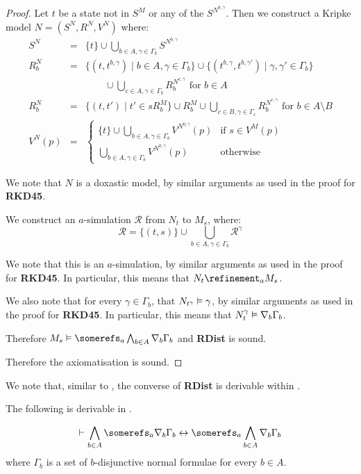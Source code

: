 \begin{proof}
Let $t$ be a state not in $S^M$ or any of the $S^{N^{b,\gamma}}$. Then we
construct a Kripke model $N = (S^N, R^N, V^N)$ where:
\begin{eqnarray*}
S^N &=& \{t\} \cup \bigcup_{b \in A, \gamma \in \Gamma_b} S^{N^{b,\gamma}}\\
R^N_b &=& \{(t, t^{b,\gamma}) \mid b \in A, \gamma \in \Gamma_b\} 
\cup \{(t^{b,\gamma}, t^{b,\gamma'}) \mid \gamma, \gamma' \in \Gamma_b\}\\
&&\qquad \cup \bigcup_{c \in A, \gamma \in \Gamma_b} R^{N^{c,\gamma}}_b \text{ for $b \in A$}\\
R^N_b &=& \{(t, t') \mid t' \in sR^M_b\} \cup R^M_b \cup
\bigcup_{c \in B, \gamma \in \Gamma_c} R^{N^{c,\gamma}}_b \text{ for $b \in A
\setminus B$}\\
V^N(p) &=& 
\begin{cases}
\displaystyle \{t\} \cup \bigcup_{b \in A, \gamma \in \Gamma_b} V^{N^{b,\gamma}}(p)
& \text{if $s \in V^M(p)$}\\
\displaystyle \bigcup_{b \in A, \gamma \in \Gamma_b} V^{N^{b,\gamma}}(p) &
\text{otherwise}
\end{cases}
\end{eqnarray*}

We note that $N$ is a doxastic model, by similar arguments as used in the proof
for {\bf RKD45}.

We construct an $a$-simulation $\mathcal{R}$ from $N_t$ to $M_s$, where:
$$\mathcal{R} = \{(t, s)\} \cup \bigcup_{b \in A, \gamma \in \Gamma_b}
\mathcal{R}^\gamma$$

We note that this is an $a$-simulation, by similar arguments as used in the
proof for {\bf RKD45}. In particular, this means that $N_t \refinement_a M_s$.

We also note that for every $\gamma \in \Gamma_b$, that $N_{t^\gamma} \vDash
\gamma$, by similar arguments as used in the proof for {\bf RKD45}. In
particular, this means that $N^\gamma_t \vDash \nabla_b \Gamma_b$.

Therefore $M_s \entails \somerefs_a \bigwedge_{b \in A} \covers_b \Gamma_b$ and
{\bf RDist} is sound.

Therefore the axiomatisation \axiomKDF{} is sound.
\end{proof}

We note that, similar to \axiomKF{}, the converse of {\bf RDist} is derivable
within \axiomKDF{}.

\begin{lemma}\label{kd45-rdist-converse}
The following is derivable in \axiomKDF{}.

$$
\proves \bigwedge_{b \in A} \somerefs_a \covers_b \Gamma_b \iff
\somerefs_a \bigwedge_{b \in A} \covers_b \Gamma_b \\
$$
where $\Gamma_b$ is a set of $b$-disjunctive normal formulae for
every $b \in A$.
\end{lemma}

